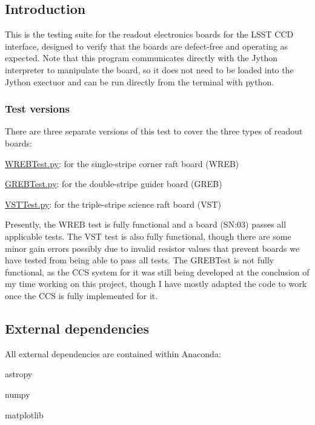 \subsection*{Introduction}

This is the testing suite for the readout electronics boards for the L\+S\+ST C\+CD interface, designed to verify that the boards are defect-\/free and operating as expected. Note that this program communicates directly with the Jython interpreter to manipulate the board, so it does not need to be loaded into the Jython exectuor and can be run directly from the terminal with python.

\subsubsection*{Test versions}

There are three separate versions of this test to cover the three types of readout boards\+:
\begin{DoxyEnumerate}
\item \hyperlink{_w_r_e_b_test_8py}{W\+R\+E\+B\+Test.\+py}\+: for the single-\/stripe corner raft board (W\+R\+EB)
\item \hyperlink{_g_r_e_b_test_8py}{G\+R\+E\+B\+Test.\+py}\+: for the double-\/stripe guider board (G\+R\+EB)
\item \hyperlink{_v_s_t_test_8py}{V\+S\+T\+Test.\+py}\+: for the triple-\/stripe science raft board (V\+ST)
\end{DoxyEnumerate}

Presently, the W\+R\+EB test is fully functional and a board (SN\+:03) passes all applicable tests. The V\+ST test is also fully functional, though there are some minor gain errors possibly due to invalid resistor values that prevent boards we have tested from being able to pass all tests. The G\+R\+E\+B\+Test is not fully functional, as the C\+CS system for it was still being developed at the conclusion of my time working on this project, though I have mostly adapted the code to work once the C\+CS is fully implemented for it.

\subsection*{External dependencies}

All external dependencies are contained within Anaconda\+:
\begin{DoxyItemize}
\item astropy
\item numpy
\item matplotlib
\end{DoxyItemize}

